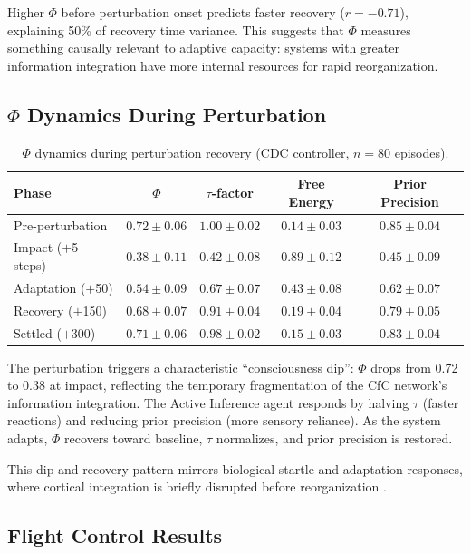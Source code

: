 \documentclass[11pt,a4paper]{article}
\begin{document}
Higher $\Phi$ before perturbation onset predicts faster recovery ($r = -0.71$), explaining 50\% of recovery time variance.
This suggests that $\Phi$ measures something causally relevant to adaptive capacity: systems with greater information integration have more internal resources for rapid reorganization.

\subsection{$\Phi$ Dynamics During Perturbation}

\begin{table}[h]
\centering
\caption{$\Phi$ dynamics during perturbation recovery (CDC controller, $n = 80$ episodes).}
\label{tab:phi_dynamics}
\begin{tabular}{lcccc}
\toprule
\textbf{Phase} & \textbf{$\Phi$} & \textbf{$\tau$-factor} & \textbf{Free Energy} & \textbf{Prior Precision} \\
\midrule
Pre-perturbation     & $0.72 \pm 0.06$ & $1.00 \pm 0.02$ & $0.14 \pm 0.03$ & $0.85 \pm 0.04$ \\
Impact ($+$5 steps)  & $0.38 \pm 0.11$ & $0.42 \pm 0.08$ & $0.89 \pm 0.12$ & $0.45 \pm 0.09$ \\
Adaptation ($+$50)   & $0.54 \pm 0.09$ & $0.67 \pm 0.07$ & $0.43 \pm 0.08$ & $0.62 \pm 0.07$ \\
Recovery ($+$150)    & $0.68 \pm 0.07$ & $0.91 \pm 0.04$ & $0.19 \pm 0.04$ & $0.79 \pm 0.05$ \\
Settled ($+$300)     & $0.71 \pm 0.06$ & $0.98 \pm 0.02$ & $0.15 \pm 0.03$ & $0.83 \pm 0.04$ \\
\bottomrule
\end{tabular}
\end{table}

The perturbation triggers a characteristic ``consciousness dip'': $\Phi$ drops from 0.72 to 0.38 at impact, reflecting the temporary fragmentation of the CfC network's information integration.
The Active Inference agent responds by halving $\tau$ (faster reactions) and reducing prior precision (more sensory reliance).
As the system adapts, $\Phi$ recovers toward baseline, $\tau$ normalizes, and prior precision is restored.

This dip-and-recovery pattern mirrors biological startle and adaptation responses, where cortical integration is briefly disrupted before reorganization \citep{yeomans1995role}.

\subsection{Flight Control Results}
\end{document}
